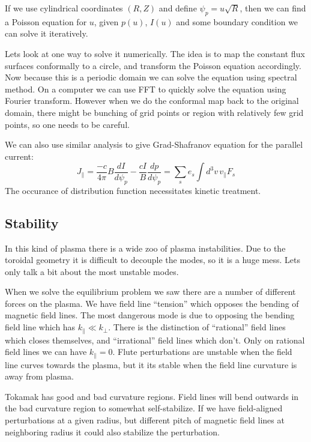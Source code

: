 \documentclass[letterpaper, 11pt]{article}
\numberwithin{equation}{section}
\numberwithin{figure}{section}
\begin{document}
If we use cylindrical coordinates $(R, Z)$ and define $\psi_p = u\sqrt{R}$, then
we can find a Poisson equation for $u$, given $p(u)$, $I(u)$ and some boundary
condition we can solve it iteratively.

Lets look at one way to solve it numerically. The idea is to map the constant
flux surfaces conformally to a circle, and transform the Poisson equation
accordingly. Now because this is a periodic domain we can solve the equation
using spectral method. On a computer we can use FFT to quickly solve the
equation using Fourier transform. However when we do the conformal map back to
the original domain, there might be bunching of grid points or region with
relatively few grid points, so one needs to be careful.

We can also use similar analysis to give Grad-Shafranov equation for the
parallel current:
\begin{equation}
  \label{eq:22}
  J_{\parallel} = \frac{-c}{4\pi}B\frac{dI}{d\psi_p} - \frac{cI}{B}\frac{dp}{d\psi_p} = \sum_se_s\int d^3v\,v_{\parallel}F_{s}
\end{equation}
The occurance of distribution function necessitates kinetic treatment.

\subsection{Stability}

In this kind of plasma there is a wide zoo of plasma instabilities. Due to the
toroidal geometry it is difficult to decouple the modes, so it is a huge mess.
Lets only talk a bit about the most unstable modes.

When we solve the equilibrium problem we saw there are a number of different
forces on the plasma. We have field line ``tension'' which opposes the bending
of magnetic field lines. The most dangerous mode is due to opposing the bending
field line which has $k_{\parallel} \ll k_{\perp}$. There is the distinction of
``rational'' field lines which closes themselves, and ``irrational'' field lines
which don't. Only on rational field lines we can have $k_{\parallel} = 0$.
Flute perturbations are unstable when the field line curves towards the plasma,
but it its stable when the field line curvature is away from plasma.

Tokamak has good and bad curvature regions. Field lines will bend outwards in
the bad curvature region to somewhat self-stabilize. If we have field-aligned
perturbations at a given radius, but different pitch of magnetic field lines at
neighboring radius it could also stabilize the perturbation.
\end{document}
